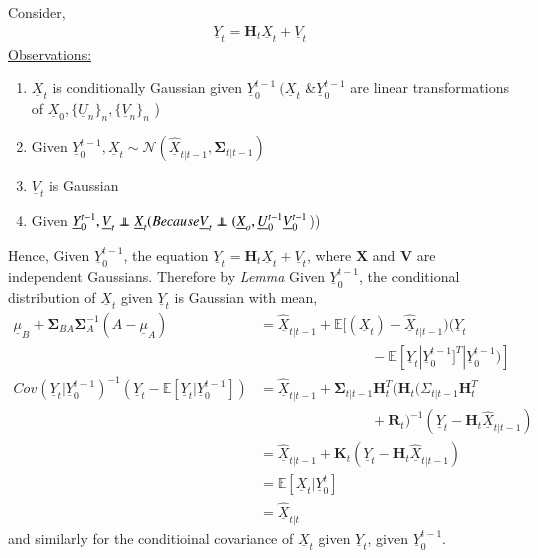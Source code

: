 \documentclass[a4paper,english,12pt]{article}
\newcommand\independent{\protect\mathpalette{\protect\independenT}{\perp}}
\def\independenT#1#2{\mathrel{\rlap{$#1#2$}\mkern2mu{#1#2}}}
\begin{document}
 Consider, 
 \begin{align*}
  \underline{Y}_t=\textbf{H}_t\underline{X}_t+\underline{V}_t
 \end{align*}
\underline{Observations:}
\begin{enumerate}
 \item $ \underline{X}_t$ is conditionally Gaussian given $\underline{Y}_0^{t-1}\ (\underline{X}_t$ \&$\underline{Y}_0^{t-1}$ are 
 linear transformations of $\underline{X}_0, \{\underline{U}_n\}_n, \{\underline{V}_n\}_n$ )
 \item Given $\underline{Y}_0^{t-1}, \underline{X}_t\sim\mathcal{N}(\underline{\hat{X}}_{t|t-1}, \mathbf{\Sigma}_{t|t-1})$
 \item $\underline{V}_t$ is Gaussian
 \item Given $\underline{Y}_0^{t-1}, \underline{V}_t\independent\underline{X}_t (Because \underline{V}_t\independent(\underline{X}_o, \underline{U}_0^{t-1}
 \underline{V}_0^{t-1}$))
\end{enumerate}
Hence, Given $ \underline{Y}_0^{t-1}$, the equation $\underline{Y}_t=\textbf{H}_t\underline{X}_t+\underline{V}_t$, 
where $\textbf{X}$ and $\textbf{V}$  are independent Gaussians. Therefore by \textit{Lemma} Given $\underline{Y}_0^{t-1}$, 
the conditional distribution of $\underline{X}_t$ given $\underline{Y}_t$ is Gaussian with mean,
\noindent
\begin{align*}
\underline{\mu}_B+ \mathbf{\Sigma}_{BA}\mathbf{\Sigma}_A^{-1}(A-\underline{\mu}_A)&=\underline{\hat{X}}_{t|t-1}+\mathbb{E}[(\underline{X}_t)-\underline{\hat{X}}_{t|t-1})(\underline{Y}_t\\
&\qquad\qquad\qquad\qquad-\mathbb{E}[\underline{Y}_t|\underline{Y}_0^{t-1}]^T|\underline{Y}_0^{t-1})]\\
Cov(\underline{Y}_t|\underline{Y}_0^{t-1})^{-1}(\underline{Y}_t-\mathbb{E}[\underline{Y}_t|\underline{Y}_0^{t-1}])&=\underline{\hat{X}}_{t|t-1}+\mathbf{\Sigma}_{t|t-1}\textbf{H}_t^T(\textbf{H}_t\mathbf(\Sigma_{t|t-1}\textbf{H}_t^T\\
&\qquad\qquad\qquad\qquad+\textbf{R}_t)^{-1}(\underline{Y}_t-\textbf{H}_t\underline{\hat{X}}_{t|t-1})\\
&=\underline{\hat{X}}_{t|t-1}+\textbf{K}_t(\underline{Y}_t-\textbf{H}_t\underline{\hat{X}}_{t|t-1})\\
&=\mathbb{E}[\underline{X}_{t}|\underline{Y}_0^t]\\
&=\underline{\hat{X}}_{t|t}
\end{align*}
and similarly for the conditioinal covariance of $\underline{X}_t$ given $\underline{Y}_t$, given $\underline{Y}_0^{t-1}$.
\end{document}
